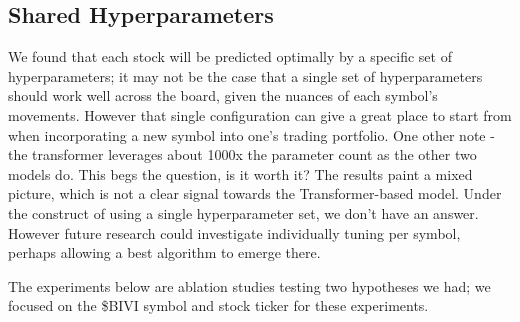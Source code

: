 \documentclass[10pt,twocolumn,letterpaper]{article}
\begin{document}
\begin{table}
\begin{center}
\end{center}
\caption{Time in seconds of each models' Average Epoch, Training, and Validation performance}
\label{tab:metrics}
\end{table}

\subsection{Shared Hyperparameters}

We found that each stock will be predicted optimally by a specific set of hyperparameters; it may not be the case that a single set of hyperparameters should work well across the board, given the nuances of each symbol’s movements. However that single configuration can give a great place to start from when incorporating a new symbol into one’s trading portfolio.
One other note - the transformer leverages about 1000x the parameter count as the other two models do. This begs the question, is it worth it? The results paint a mixed picture, which is not a clear signal towards the Transformer-based model. Under the construct of using a single hyperparameter set, we don’t have an answer. However future research could investigate individually tuning per symbol, perhaps allowing a best algorithm to emerge there.

The experiments below are ablation studies testing two hypotheses we had; we focused on the \$BIVI symbol and stock ticker for these experiments.
\end{document}
